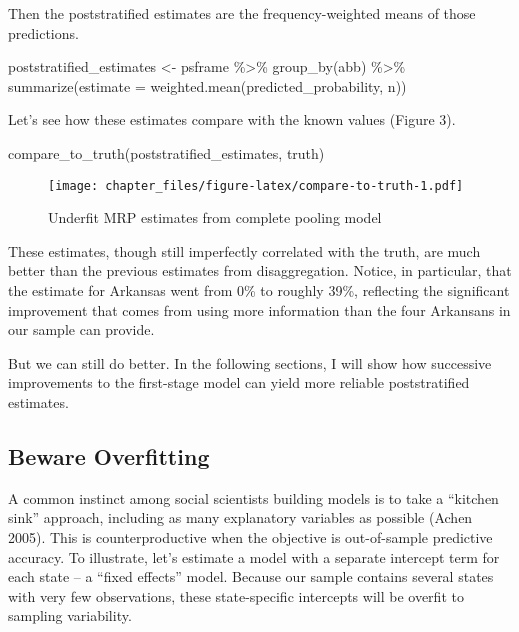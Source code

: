\documentclass[
]{article}
\newenvironment{Shaded}{\begin{snugshade}}{\end{snugshade}}
\newcommand{\AttributeTok}[1]{\textcolor[rgb]{0.77,0.63,0.00}{#1}}
\newcommand{\FunctionTok}[1]{\textcolor[rgb]{0.00,0.00,0.00}{#1}}
\newcommand{\NormalTok}[1]{#1}
\newcommand{\OtherTok}[1]{\textcolor[rgb]{0.56,0.35,0.01}{#1}}
\newcommand{\SpecialCharTok}[1]{\textcolor[rgb]{0.00,0.00,0.00}{#1}}
\begin{document}
Then the poststratified estimates are the frequency-weighted means of
those predictions.

\begin{Shaded}
\begin{Highlighting}[]
\NormalTok{poststratified\_estimates }\OtherTok{\textless{}{-}}\NormalTok{ psframe }\SpecialCharTok{\%\textgreater{}\%} 
  \FunctionTok{group\_by}\NormalTok{(abb) }\SpecialCharTok{\%\textgreater{}\%} 
  \FunctionTok{summarize}\NormalTok{(}\AttributeTok{estimate =} \FunctionTok{weighted.mean}\NormalTok{(predicted\_probability, n))}
\end{Highlighting}
\end{Shaded}

Let's see how these estimates compare with the known values (Figure 3).

\begin{Shaded}
\begin{Highlighting}[]
\FunctionTok{compare\_to\_truth}\NormalTok{(poststratified\_estimates, truth)}
\end{Highlighting}
\end{Shaded}

\begin{figure}
\centering
\texttt{[image: chapter\_files/figure-latex/compare-to-truth-1.pdf]}
\caption{Underfit MRP estimates from complete pooling model}
\end{figure}

These estimates, though still imperfectly correlated with the truth, are
much better than the previous estimates from disaggregation. Notice, in
particular, that the estimate for Arkansas went from 0\% to roughly
39\%, reflecting the significant improvement that comes from using more
information than the four Arkansans in our sample can provide.

But we can still do better. In the following sections, I will show how
successive improvements to the first-stage model can yield more reliable
poststratified estimates.

\hypertarget{beware-overfitting}{%
\subsection{Beware Overfitting}\label{beware-overfitting}}

A common instinct among social scientists building models is to take a
``kitchen sink'' approach, including as many explanatory variables as
possible (Achen 2005). This is counterproductive when the objective is
out-of-sample predictive accuracy. To illustrate, let's estimate a model
with a separate intercept term for each state -- a ``fixed effects''
model. Because our sample contains several states with very few
observations, these state-specific intercepts will be overfit to
sampling variability.
\end{document}
